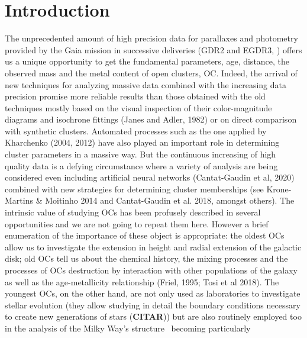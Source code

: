 \documentclass{aa}
\begin{document}

\maketitle


\section{Introduction}

 The unprecedented amount of high precision data for parallaxes and photometry provided by the Gaia mission in successive deliveries (GDR2 and EGDR3, \cite{Gaia_2016,Gaia_EDR3}) offers us a unique opportunity to get the fundamental parameters, age, distance, the observed mass and the metal content of open clusters, OC. Indeed, the arrival of new techniques for analyzing massive data 
 combined with the increasing data precision promise more reliable results than those obtained with the old techniques mostly based on the visual inspection of their color-magnitude diagrams and isochrone fittings (Janes and Adler, 1982) or on direct comparison with synthetic clusters. Automated processes such as the one applied by Kharchenko (2004, 2012) have also played an important role in determining cluster parameters in a massive way. But the continuous increasing of high quality data is a defying circumstance where a variety of analysis are being considered even including artificial neural networks (Cantat-Gaudin et al, 2020) combined with new strategies for determining cluster memberships (see Krone-Martins \& Moitinho 2014 and Cantat-Gaudin et al. 2018, amongst others). The intrinsic value of studying OCs has been profusely described in several opportunities and we are not going to repeat them here. However a brief enumeration of the importance of these object is appropriate: the oldest OCs allow us to investigate the extension in height and radial extension of the galactic disk; old OCs tell us about the chemical history, the mixing processes and the processes of OCs destruction by interaction with other populations of the galaxy as well as the age-metallicity relationship (Friel, 1995; Tosi et al 2018). The youngest OCs, on the other hand, are not only used as laboratories to investigate stellar evolution (they allow studying in detail the boundary conditions necessary to create new generations of stars (\textbf{CITAR})) but are also routinely employed too in the analysis of the Milky Way's structure~\citep{Loktin_1992,Moitinho_2006,Vazquez2008,Moitinho_2010} becoming particularly
\end{document}
